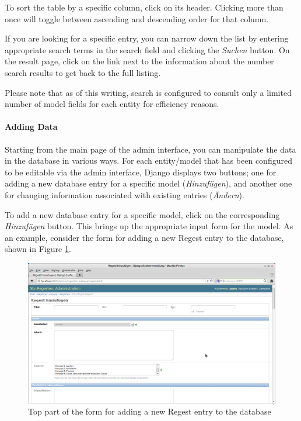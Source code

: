 To sort the table by a specific column, click on its header. Clicking
more than once will toggle between ascending and descending order for
that column.

If you are looking for a specific entry, you can narrow down the list
by entering appropriate search terms in the search field and clicking
the \emph{Suchen} button. On the result page, click on the link next
to the information about the number search results to get back to the
full listing.

Please note that as of this writing, search is configured to consult
only a limited number of model fields for each entity for efficiency
reasons.

\paragraph{Adding Data}
Starting from the main page of the admin interface, you can manipulate
the data in the database in various ways. For each entity/model that
has been configured to be editable via the admin interface, Django
displays two buttons; one for adding a new database entry for a
specific model (\emph{Hinzufügen}), and another one for changing
information associated with existing entries (\emph{Ändern}).

To add a new database entry for a specific model, click on the
corresponding \emph{Hinzufügen} button. This brings up the appropriate
input form for the model. As an example, consider the form for adding
a new Regest entry to the database, shown in Figure
\ref{fig:add-regest}.

\begin{figure}[h]
  \centering
  \includegraphics[scale=0.3]{img/add-regest}
  \caption{Top part of the form for adding a new Regest entry to the
    database}
  \label{fig:add-regest}
\end{figure}

